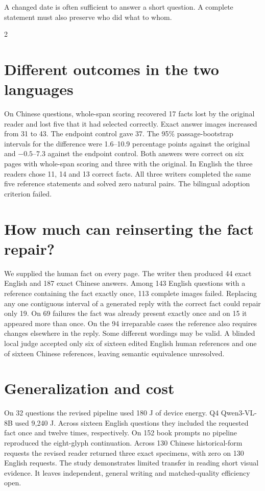 \newpage
{}
\noindent A changed date is often sufficient to answer a short question. A complete statement must also preserve who did what to whom.
\begin{multicols}{2}
\section*{Different outcomes in the two languages}
On Chinese questions, whole-span scoring recovered 17 facts lost by the original reader and lost five that it had selected correctly. Exact answer images increased from 31 to 43. The endpoint control gave 37. The 95\% passage-bootstrap intervals for the difference were 1.6--10.9 percentage points against the original and $-0.5$--7.3 against the endpoint control. Both answers were correct on six pages with whole-span scoring and three with the original. In English the three readers chose 11, 14 and 13 correct facts. All three writers completed the same five reference statements and solved zero natural pairs. The bilingual adoption criterion failed.
\section*{How much can reinserting the fact repair?}
We supplied the human fact on every page. The writer then produced 44 exact English and 187 exact Chinese answers. Among 143 English questions with a reference containing the fact exactly once, 113 complete images failed. Replacing any one contiguous interval of a generated reply with the correct fact could repair only 19. On 69 failures the fact was already present exactly once and on 15 it appeared more than once. On the 94 irreparable cases the reference also requires changes elsewhere in the reply. Some different wordings may be valid. A blinded local judge accepted only six of sixteen edited English human references and one of sixteen Chinese references, leaving semantic equivalence unresolved.
\section*{Generalization and cost}
On 32 questions the revised pipeline used 180 J of device energy. Q4 Qwen3-VL-8B used 9,240 J. Across sixteen English questions they included the requested fact once and twelve times, respectively. On 152 book prompts no pipeline reproduced the eight-glyph continuation. Across 130 Chinese historical-form requests the revised reader returned three exact specimens, with zero on 130 English requests. The study demonstrates limited transfer in reading short visual evidence. It leaves independent, general writing and matched-quality efficiency open.
\end{multicols}
